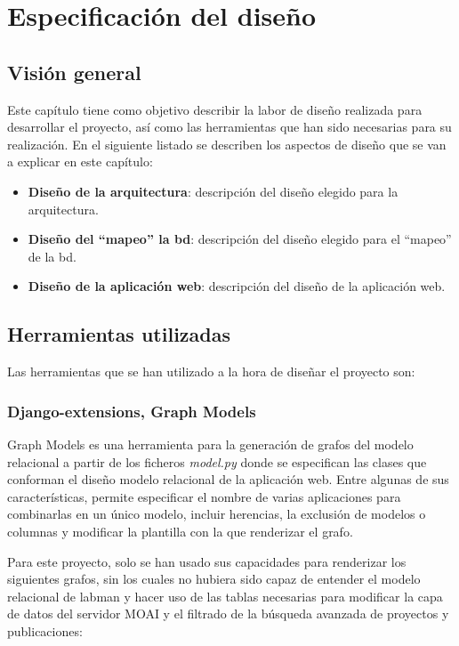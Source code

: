 \chapter{Especificación del diseño}\label{chap:design}

\section{Visión general}

Este capítulo tiene como objetivo describir la labor de diseño realizada para desarrollar el proyecto, así como las herramientas que han sido necesarias para su realización. En el siguiente listado se describen los aspectos de diseño que se van a explicar en este capítulo:

\begin{itemize}
	\item \textbf{Diseño de la arquitectura}: descripción del diseño elegido para la arquitectura.
	\item \textbf{Diseño del ``mapeo'' la \acrlong{bd}}: descripción del diseño elegido para el ``mapeo'' de la \acrshort{bd}.
	\item \textbf{Diseño de la aplicación web}: descripción del diseño de la aplicación web.

\end{itemize}

\section{Herramientas utilizadas}

Las herramientas que se han utilizado a la hora de diseñar el proyecto son:

\subsection{Django-extensions, Graph Models}

Graph Models es una herramienta para la generación de grafos del modelo relacional a partir de los ficheros \textit{model.py} donde se especifican las clases que conforman el diseño modelo relacional de la aplicación web. Entre algunas de sus características, permite especificar el nombre de varias aplicaciones para combinarlas en un único modelo, incluir herencias, la exclusión de modelos o columnas y modificar la plantilla con la que renderizar el grafo.

Para este proyecto, solo se han usado sus capacidades para renderizar los siguientes grafos, sin los cuales no hubiera sido capaz de entender el modelo relacional de \acrshort{labman} y hacer uso de las tablas necesarias para modificar la capa de datos del servidor MOAI y el filtrado de la búsqueda avanzada de proyectos y publicaciones:

